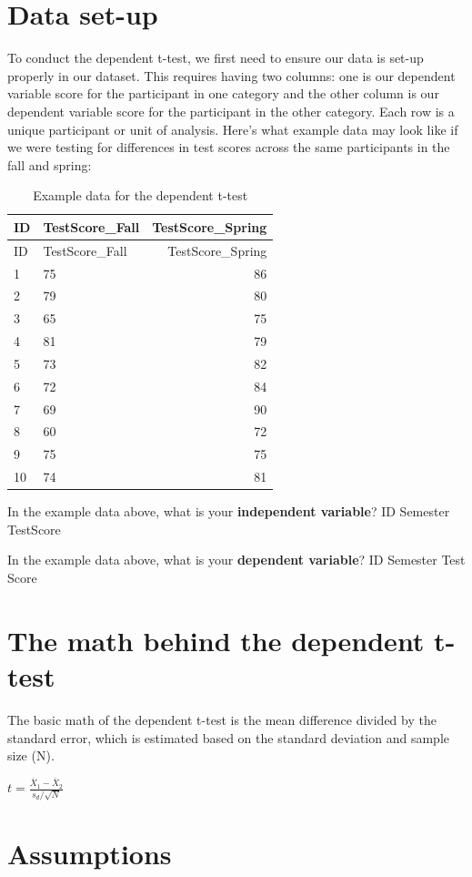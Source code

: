 \documentclass[
]{book}
\begin{document}
\hypertarget{data-set-up-1}{%
\section{Data set-up}\label{data-set-up-1}}

To conduct the dependent t-test, we first need to ensure our data is set-up properly in our dataset. This requires having two columns: one is our dependent variable score for the participant in one category and the other column is our dependent variable score for the participant in the other category. Each row is a unique participant or unit of analysis. Here's what example data may look like if we were testing for differences in test scores across the same participants in the fall and spring:

\begin{longtable}[]{@{}llr@{}}
\caption{Example data for the dependent t-test}\tabularnewline
\toprule
ID & TestScore\_Fall & TestScore\_Spring\tabularnewline
\midrule
\endfirsthead
\toprule
ID & TestScore\_Fall & TestScore\_Spring\tabularnewline
\midrule
\endhead
1 & 75 & 86\tabularnewline
2 & 79 & 80\tabularnewline
3 & 65 & 75\tabularnewline
4 & 81 & 79\tabularnewline
5 & 73 & 82\tabularnewline
6 & 72 & 84\tabularnewline
7 & 69 & 90\tabularnewline
8 & 60 & 72\tabularnewline
9 & 75 & 75\tabularnewline
10 & 74 & 81\tabularnewline
\bottomrule
\end{longtable}

In the example data above, what is your \textbf{independent variable}? ID Semester TestScore

In the example data above, what is your \textbf{dependent variable}? ID Semester Test Score

\hypertarget{the-math-behind-the-dependent-t-test}{%
\section{The math behind the dependent t-test}\label{the-math-behind-the-dependent-t-test}}

The basic math of the dependent t-test is the mean difference divided by the standard error, which is estimated based on the standard deviation and sample size (N).

\(t = \frac{\bar{X}_1 - \bar{X}_2}{s_d/ \sqrt{N}}\)

\hypertarget{assumptions-1}{%
\section{Assumptions}\label{assumptions-1}}
\end{document}
